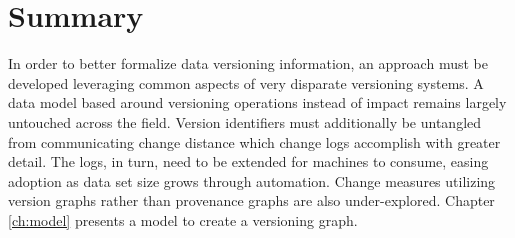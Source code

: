 \section{Summary}

In order to better formalize data versioning information, an approach must be developed leveraging common aspects of very disparate versioning systems.
A data model based around versioning operations instead of impact remains largely untouched across the field.
Version identifiers must additionally be untangled from communicating change distance which change logs accomplish with greater detail.
The logs, in turn, need to be extended for machines to consume, easing adoption as data set size grows through automation.
Change measures utilizing version graphs rather than provenance graphs are also under-explored.
Chapter \ref{ch:model} presents a model to create a versioning graph.

